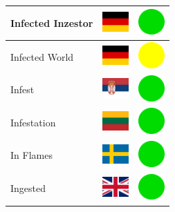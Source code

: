 \documentclass[12pt, a4paper, twoside]{report}
\begin{document}
\begin{center}
\begin{longtable}{|p{5cm}|p{2cm}|p{2cm}|}
 Infected Inzestor                                          & \includegraphics[width=1cm]{../4x3/de} &   \includegraphics[width=1cm]{../likes/y} \\ \hline
 Infected World                                             & \includegraphics[width=1cm]{../4x3/de} &   \includegraphics[width=1cm]{../likes/m} \\ \hline
 Infest                                                     & \includegraphics[width=1cm]{../4x3/rs} &   \includegraphics[width=1cm]{../likes/y} \\ \hline
 Infestation                                                & \includegraphics[width=1cm]{../4x3/lt} &   \includegraphics[width=1cm]{../likes/y} \\ \hline
 In Flames                                                  & \includegraphics[width=1cm]{../4x3/se} &   \includegraphics[width=1cm]{../likes/y} \\ \hline
 Ingested                                                   & \includegraphics[width=1cm]{../4x3/gb} &   \includegraphics[width=1cm]{../likes/y} \\ \hline

\end{longtable}
\end{center}
\end{document}
